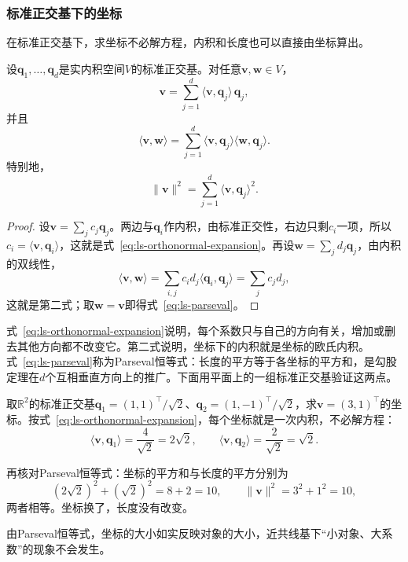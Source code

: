\subsubsection{标准正交基下的坐标}
\label{sec:ls-orthonormal-coordinates}
在标准正交基下，求坐标不必解方程，内积和长度也可以直接由坐标算出。
\begin{theorem}[Parseval恒等式]
\label{thm:ls-parseval}
设$\bm q_1,\ldots,\bm q_d$是实内积空间$V$的标准正交基。对任意$\bm v,\bm w\in V$，
\begin{equation}
 \bm v=\sum_{j=1}^d\langle\bm v,\bm q_j\rangle\,\bm q_j,
 \label{eq:ls-orthonormal-expansion}
\end{equation}
并且
\begin{equation}
 \langle\bm v,\bm w\rangle=\sum_{j=1}^d\langle\bm v,\bm q_j\rangle\langle\bm w,\bm q_j\rangle .
 \label{eq:ls-parseval-inner-product}
\end{equation}
特别地，
\begin{equation}
 \lVert\bm v\rVert^2=\sum_{j=1}^d\langle\bm v,\bm q_j\rangle^2.
 \label{eq:ls-parseval}
\end{equation}
\end{theorem}
\begin{proof}
设$\bm v=\sum_jc_j\bm q_j$。两边与$\bm q_i$作内积，由标准正交性，右边只剩$c_i$一项，所以$c_i=\langle\bm v,\bm q_i\rangle$，这就是式~\eqref{eq:ls-orthonormal-expansion}。再设$\bm w=\sum_jd_j\bm q_j$，由内积的双线性，
\[
 \langle\bm v,\bm w\rangle=\sum_{i,j}c_id_j\langle\bm q_i,\bm q_j\rangle=\sum_jc_jd_j,
\]
这就是第二式；取$\bm w=\bm v$即得式~\eqref{eq:ls-parseval}。
\end{proof}
式~\eqref{eq:ls-orthonormal-expansion}说明，每个系数只与自己的方向有关，增加或删去其他方向都不改变它。第二式说明，坐标下的内积就是坐标的欧氏内积。式~\eqref{eq:ls-parseval}称为Parseval恒等式：长度的平方等于各坐标的平方和，是勾股定理在$d$个互相垂直方向上的推广。下面用平面上的一组标准正交基验证这两点。
\begin{example}[标准正交基下的坐标与Parseval恒等式]
\label{ex:ls-orthonormal-coordinates}
取$\mathbb R^2$的标准正交基$\bm q_1=(1,1)^\top/\sqrt2$、$\bm q_2=(1,-1)^\top/\sqrt2$，求$\bm v=(3,1)^\top$的坐标。按式~\eqref{eq:ls-orthonormal-expansion}，每个坐标就是一次内积，不必解方程：
\[
 \langle\bm v,\bm q_1\rangle=\frac4{\sqrt2}=2\sqrt2,\qquad
 \langle\bm v,\bm q_2\rangle=\frac2{\sqrt2}=\sqrt2 .
\]

再核对Parseval恒等式：坐标的平方和与长度的平方分别为
\[
 (2\sqrt2)^2+(\sqrt2)^2=8+2=10,\qquad\lVert\bm v\rVert^2=3^2+1^2=10,
\]
两者相等。坐标换了，长度没有改变。
\end{example}
由Parseval恒等式，坐标的大小如实反映对象的大小，近共线基下“小对象、大系数”的现象不会发生。

